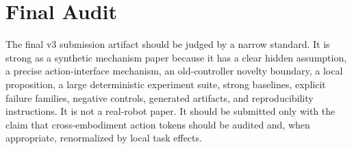 \documentclass{article}
\begin{document}
\section{Final Audit}

The final v3 submission artifact should be judged by a narrow standard. It is strong as a synthetic mechanism paper because it has a clear hidden assumption, a precise action-interface mechanism, an old-controller novelty boundary, a local proposition, a large deterministic experiment suite, strong baselines, explicit failure families, negative controls, generated artifacts, and reproducibility instructions. It is not a real-robot paper. It should be submitted only with the claim that cross-embodiment action tokens should be audited and, when appropriate, renormalized by local task effects.
\end{document}
